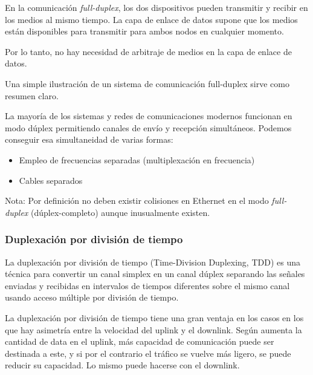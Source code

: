 \documentclass[a4paper]{article}
\begin{document}
	En la comunicación \textit{full-duplex}, los dos dispositivos pueden transmitir y recibir en los medios al mismo tiempo. La capa de enlace de datos supone que los medios están disponibles para transmitir para ambos nodos en cualquier momento. 
	
	Por lo tanto, no hay necesidad de arbitraje de medios en la capa de enlace de datos.
	
	Una simple ilustración de un sistema de comunicación full-duplex sirve como resumen claro.
	
	\noindent{}
	
	La mayoría de los sistemas y redes de comunicaciones modernos funcionan en modo dúplex permitiendo canales de envío y recepción simultáneos. Podemos conseguir esa simultaneidad de varias formas:
	\begin{itemize}
		\item Empleo de frecuencias separadas (multiplexación en frecuencia)
		\item Cables separados
	\end{itemize}
	Nota: Por definición no deben existir colisiones en Ethernet en el modo \textit{full-duplex} (dúplex-completo) aunque inusualmente existen.
	
	\subsubsection{Duplexación por división de tiempo}
	
	La duplexación por división de tiempo (Time-Division Duplexing, TDD) es una técnica para convertir un canal simplex en un canal dúplex separando las señales enviadas y recibidas en intervalos de tiempos diferentes sobre el mismo canal usando acceso múltiple por división de tiempo.
	
	La duplexación por división de tiempo tiene una gran ventaja en los casos en los que hay asimetría entre la velocidad del uplink y el downlink. Según aumenta la cantidad de data en el uplink, más capacidad de comunicación puede ser destinada a este, y si por el contrario el tráfico se vuelve más ligero, se puede reducir su capacidad. Lo mismo puede hacerse con el downlink.
	
\end{document}
